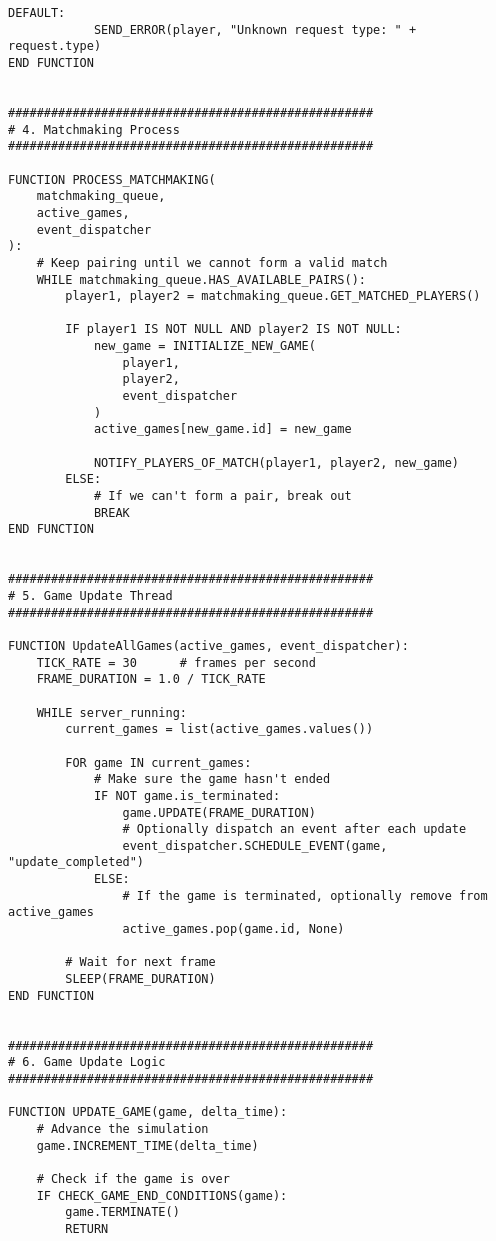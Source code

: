 \documentclass{article}
\begin{document}
\begin{lstlisting}[style=pseudo]
        DEFAULT:
            SEND_ERROR(player, "Unknown request type: " + request.type)
END FUNCTION


###################################################
# 4. Matchmaking Process
###################################################

FUNCTION PROCESS_MATCHMAKING(
    matchmaking_queue, 
    active_games, 
    event_dispatcher
):
    # Keep pairing until we cannot form a valid match
    WHILE matchmaking_queue.HAS_AVAILABLE_PAIRS():
        player1, player2 = matchmaking_queue.GET_MATCHED_PLAYERS()
        
        IF player1 IS NOT NULL AND player2 IS NOT NULL:
            new_game = INITIALIZE_NEW_GAME(
                player1, 
                player2, 
                event_dispatcher
            )
            active_games[new_game.id] = new_game

            NOTIFY_PLAYERS_OF_MATCH(player1, player2, new_game)
        ELSE:
            # If we can't form a pair, break out
            BREAK
END FUNCTION


###################################################
# 5. Game Update Thread
###################################################

FUNCTION UpdateAllGames(active_games, event_dispatcher):
    TICK_RATE = 30      # frames per second
    FRAME_DURATION = 1.0 / TICK_RATE

    WHILE server_running:
        current_games = list(active_games.values())
        
        FOR game IN current_games:
            # Make sure the game hasn't ended
            IF NOT game.is_terminated:
                game.UPDATE(FRAME_DURATION)
                # Optionally dispatch an event after each update
                event_dispatcher.SCHEDULE_EVENT(game, "update_completed")
            ELSE:
                # If the game is terminated, optionally remove from active_games
                active_games.pop(game.id, None)

        # Wait for next frame
        SLEEP(FRAME_DURATION)
END FUNCTION


###################################################
# 6. Game Update Logic
###################################################

FUNCTION UPDATE_GAME(game, delta_time):
    # Advance the simulation
    game.INCREMENT_TIME(delta_time)
    
    # Check if the game is over
    IF CHECK_GAME_END_CONDITIONS(game):
        game.TERMINATE()
        RETURN


\end{lstlisting}
\end{document}
